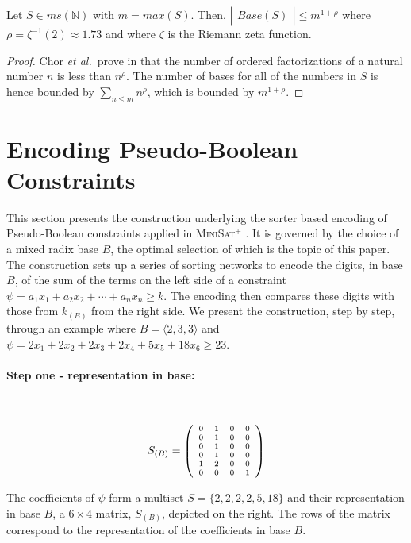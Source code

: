 \documentclass[envcountsame]{llncs}
\newcommand\tuple[1]{\langle #1 \rangle}
\newcommand\etal{{\it et al{.}}}
\newcommand\minisatp{\textsc{MiniSat$^+$}}
\newcommand{\Base}{\mathit{Base}}
\newcommand{\intMultiSet}{\mathit{ms(\mathbb{N})}}
\newcommand{\card}[1]{ 
    \left|
      \begin{array}{l}#1\end{array}
    \right|}
\begin{document}
\begin{lemma}\label{zeta}
  Let $S\in\intMultiSet$  with $m=max(S)$. Then,
  $\card{\Base(S)} \leq m^{1+\rho}$ where
  $\rho=\zeta^{-1}(2)\approx 1.73$ and where $\zeta$ is the Riemann
  zeta function.
\end{lemma}

\begin{proof}
  Chor \etal\ prove in \cite{ChorLM00} that the number of ordered
  factorizations of a natural number $n$ is less than $n^{\rho}$. The
  number of bases for all of the numbers in $S$ is hence bounded by
  $\sum_{n\leq m}n^{\rho}$, which is bounded by $m^{1+\rho}$.
\end{proof}


\section{Encoding Pseudo-Boolean Constraints}
\label{sec:encoding}

This section presents the construction underlying the sorter based
encoding of Pseudo-Boolean constraints applied in \minisatp
\cite{EenS06}.  It is governed by the choice of a mixed radix base
$B$, the optimal selection of which is the topic of this paper. 
The construction sets up a series of sorting networks to encode the 
\pagebreak
digits, in base $B$, of the sum of the terms on the left side of a 
constraint $\psi = a_1x_1 + a_2x_2 + \cdots + a_nx_n \geq k$. The
encoding then compares these digits with those from $k_{(B)}$ from the
right side.
We present the construction, step by step, through an example where
$B=\tuple{2,3,3}$ and $\psi = 2x_1 + 2x_2 + 2x_3 + 2x_4 + 5x_5 + 18x_6
\geq 23$. 


\vspace{-2mm}
\paragraph{\textbf{Step one - representation in base:}}~\\
\vspace{-3mm}
\begin{wrapfigure}{r}{30mm}\vspace{-17mm}
\[\scriptsize
     S_{(B)}=\left(
       \begin{array}{lllll}
           0 & 1 & 0 & 0 \\
           0 & 1 & 0 & 0 \\
           0 & 1 & 0 & 0 \\
           0 & 1 & 0 & 0 \\
           1 & 2 & 0 & 0 \\
           0 & 0 & 0 & 1 \\
       \end{array}
     \right)
\]
\vspace{-13mm}
\end{wrapfigure}
\noindent
The coefficients of $\psi$ form a multiset $S= \{2, 2, 2, 2, 5, 18\}$
and their representation in base $B$, a $6\times 4$ matrix,
$S_{(B)}$, depicted on the right. The  rows of the matrix
correspond to  the representation of the coefficients
 in base $B$.
\end{document}

